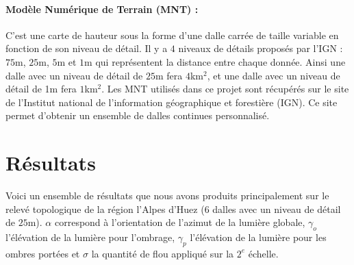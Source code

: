 \paragraph*{Modèle Numérique de Terrain (MNT) : } C'est une carte de hauteur sous la forme d'une dalle carrée de taille variable en fonction de son niveau de détail. Il y a $4$ niveaux de détails proposés par l'IGN : $75$m, $25$m, $5$m et $1$m qui représentent la distance entre chaque donnée. Ainsi une dalle avec un niveau de détail de $25$m fera $4$km$^{2}$, et une dalle avec un niveau de détail de 1m fera $1$km$^{2}$. Les MNT utilisés dans ce projet sont récupérés sur le site de l'Institut national de l'information géographique et forestière (IGN). Ce site permet d'obtenir un ensemble de dalles continues personnalisé.   




\section{Résultats}
Voici un ensemble de résultats que nous avons produits principalement sur le relevé topologique de la région l'Alpes d'Huez (6 dalles avec un niveau de détail de $25$m). $\alpha$ correspond à l'orientation de l'azimut de la lumière globale, $\gamma_o$  l'élévation de la lumière pour l'ombrage, $\gamma_p$ l'élévation de la lumière pour les ombres portées et $\sigma$ la quantité de flou appliqué sur la $2^e$ échelle.  

